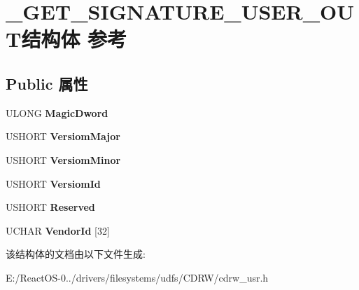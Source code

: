 \hypertarget{struct___g_e_t___s_i_g_n_a_t_u_r_e___u_s_e_r___o_u_t}{}\section{\+\_\+\+G\+E\+T\+\_\+\+S\+I\+G\+N\+A\+T\+U\+R\+E\+\_\+\+U\+S\+E\+R\+\_\+\+O\+U\+T结构体 参考}
\label{struct___g_e_t___s_i_g_n_a_t_u_r_e___u_s_e_r___o_u_t}
\subsection*{Public 属性}
\begin{DoxyCompactItemize}
\item 
\mbox{\label{struct___g_e_t___s_i_g_n_a_t_u_r_e___u_s_e_r___o_u_t_a5f874d19c7575f68c46927dbcfe0e55a}} 
U\+L\+O\+NG {\bfseries Magic\+Dword}
\item 
\mbox{\label{struct___g_e_t___s_i_g_n_a_t_u_r_e___u_s_e_r___o_u_t_a1acaf7b8d6d7ff0729548391c7b8ec34}} 
U\+S\+H\+O\+RT {\bfseries Versiom\+Major}
\item 
\mbox{\label{struct___g_e_t___s_i_g_n_a_t_u_r_e___u_s_e_r___o_u_t_a32b5f1dc6f06d7490819893950951bba}} 
U\+S\+H\+O\+RT {\bfseries Versiom\+Minor}
\item 
\mbox{\label{struct___g_e_t___s_i_g_n_a_t_u_r_e___u_s_e_r___o_u_t_a3908c30142fdbc526bc3d02f6b30fdc3}} 
U\+S\+H\+O\+RT {\bfseries Versiom\+Id}
\item 
\mbox{\label{struct___g_e_t___s_i_g_n_a_t_u_r_e___u_s_e_r___o_u_t_adb212bff0df5df61db01d3971d116f8c}} 
U\+S\+H\+O\+RT {\bfseries Reserved}
\item 
\mbox{\label{struct___g_e_t___s_i_g_n_a_t_u_r_e___u_s_e_r___o_u_t_a249e9724066c18b7a65ada3d2555ffbf}} 
U\+C\+H\+AR {\bfseries Vendor\+Id} \mbox{[}32\mbox{]}
\end{DoxyCompactItemize}


该结构体的文档由以下文件生成\+:\begin{DoxyCompactItemize}
\item 
E\+:/\+React\+O\+S-\/0../drivers/filesystems/udfs/\+C\+D\+R\+W/cdrw\+\_\+usr.\+h\end{DoxyCompactItemize}
